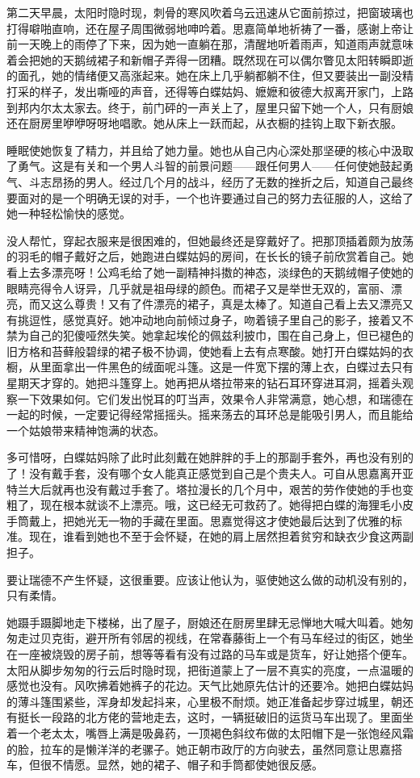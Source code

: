 \par 第二天早晨，太阳时隐时现，刺骨的寒风吹着乌云迅速从它面前掠过，把窗玻璃也打得噼啪直响，还在屋子周围微弱地呻吟着。思嘉简单地祈祷了一番，感谢上帝让前一天晚上的雨停了下来，因为她一直躺在那，清醒地听着雨声，知道雨声就意味着会把她的天鹅绒裙子和新帽子弄得一团糟。既然现在可以偶尔瞥见太阳转瞬即逝的面孔，她的情绪便又高涨起来。她在床上几乎躺都躺不住，但又要装出一副没精打采的样子，发出嘶哑的声音，还得等白蝶姑妈、嬷嬷和彼德大叔离开家门，上路到邦内尔太太家去。终于，前门砰的一声关上了，屋里只留下她一个人，只有厨娘还在厨房里咿咿呀呀地唱歌。她从床上一跃而起，从衣橱的挂钩上取下新衣服。
\par 睡眠使她恢复了精力，并且给了她力量。她也从自己内心深处那坚硬的核心中汲取了勇气。这是有关和一个男人斗智的前景问题——跟任何男人——任何使她鼓起勇气、斗志昂扬的男人。经过几个月的战斗，经历了无数的挫折之后，知道自己最终要面对的是一个明确无误的对手，一个也许要通过自己的努力去征服的人，这给了她一种轻松愉快的感觉。
\par 没人帮忙，穿起衣服来是很困难的，但她最终还是穿戴好了。把那顶插着颇为放荡的羽毛的帽子戴好之后，她跑进白蝶姑妈的房间，在长长的镜子前欣赏着自己。她看上去多漂亮呀！公鸡毛给了她一副精神抖擞的神态，淡绿色的天鹅绒帽子使她的眼睛亮得令人讶异，几乎就是祖母绿的颜色。而裙子又是举世无双的，富丽、漂亮，而又这么尊贵！又有了件漂亮的裙子，真是太棒了。知道自己看上去又漂亮又有挑逗性，感觉真好。她冲动地向前倾过身子，吻着镜子里自己的影子，接着又不禁为自己的犯傻哑然失笑。她拿起埃伦的佩兹利披巾，围在自己身上，但已褪色的旧方格和苔藓般碧绿的裙子极不协调，使她看上去有点寒酸。她打开白蝶姑妈的衣橱，从里面拿出一件黑色的绒面呢斗篷。这是一件宽下摆的薄上衣，白蝶过去只有星期天才穿的。她把斗篷穿上。她再把从塔拉带来的钻石耳环穿进耳洞，摇着头观察一下效果如何。它们发出悦耳的叮当声，效果令人非常满意，她心想，和瑞德在一起的时候，一定要记得经常摇摇头。摇来荡去的耳环总是能吸引男人，而且能给一个姑娘带来精神饱满的状态。
\par 多可惜呀，白蝶姑妈除了此时此刻戴在她胖胖的手上的那副手套外，再也没有别的了！没有戴手套，没有哪个女人能真正感觉到自己是个贵夫人。可自从思嘉离开亚特兰大后就再也没有戴过手套了。塔拉漫长的几个月中，艰苦的劳作使她的手也变粗了，现在根本就谈不上漂亮。哦，这已经无可救药了。她得把白蝶的海狸毛小皮手筒戴上，把她光无一物的手藏在里面。思嘉觉得这才使她最后达到了优雅的标准。现在，谁看到她也不至于会怀疑，在她的肩上居然担着贫穷和缺衣少食这两副担子。
\par 要让瑞德不产生怀疑，这很重要。应该让他认为，驱使她这么做的动机没有别的，只有柔情。
\par 她蹑手蹑脚地走下楼梯，出了屋子，厨娘还在厨房里肆无忌惮地大喊大叫着。她匆匆走过贝克街，避开所有邻居的视线，在常春藤街上一个有马车经过的街区，她坐在一座被烧毁的房子前，想等等看有没有过路的马车或是货车，好让她搭个便车。太阳从脚步匆匆的行云后时隐时现，把街道蒙上了一层不真实的亮度，一点温暖的感觉也没有。风吹拂着她裤子的花边。天气比她原先估计的还要冷。她把白蝶姑妈的薄斗篷围紧些，浑身却发起抖来，心里极不耐烦。她正准备起步穿过城里，朝还有挺长一段路的北方佬的营地走去，这时，一辆挺破旧的运货马车出现了。里面坐着一个老太太，嘴唇上满是吸鼻药，一顶褐色斜纹布做的太阳帽下是一张饱经风霜的脸，拉车的是懒洋洋的老骡子。她正朝市政厅的方向驶去，虽然同意让思嘉搭车，但很不情愿。显然，她的裙子、帽子和手筒都使她很反感。

